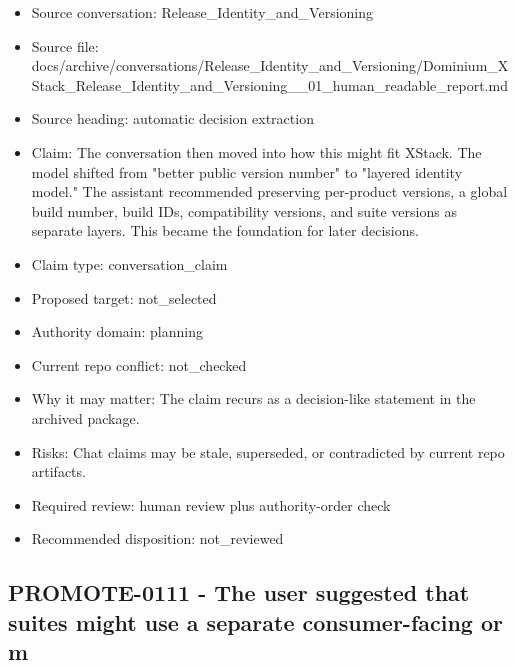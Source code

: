\documentclass[11pt,a4paper]{report}
\begin{document}
\begin{itemize}
\item Source conversation: Release\_Identity\_and\_Versioning
\item Source file: docs/archive/conversations/Release\_Identity\_and\_Versioning/Dominium\_XStack\_Release\_Identity\_and\_Versioning\_\_01\_human\_readable\_report.md
\item Source heading: automatic decision extraction
\item Claim: The conversation then moved into how this might fit XStack. The model shifted from "better public version number" to "layered identity model." The assistant recommended preserving per-product versions, a global build number, build IDs, compatibility versions, and suite versions as separate layers. This became the foundation for later decisions.
\item Claim type: conversation\_claim
\item Proposed target: not\_selected
\item Authority domain: planning
\item Current repo conflict: not\_checked
\item Why it may matter: The claim recurs as a decision-like statement in the archived package.
\item Risks: Chat claims may be stale, superseded, or contradicted by current repo artifacts.
\item Required review: human review plus authority-order check
\item Recommended disposition: not\_reviewed
\end{itemize}

\subsection{PROMOTE-0111 - The user suggested that suites might use a separate consumer-facing or m}
\end{document}
